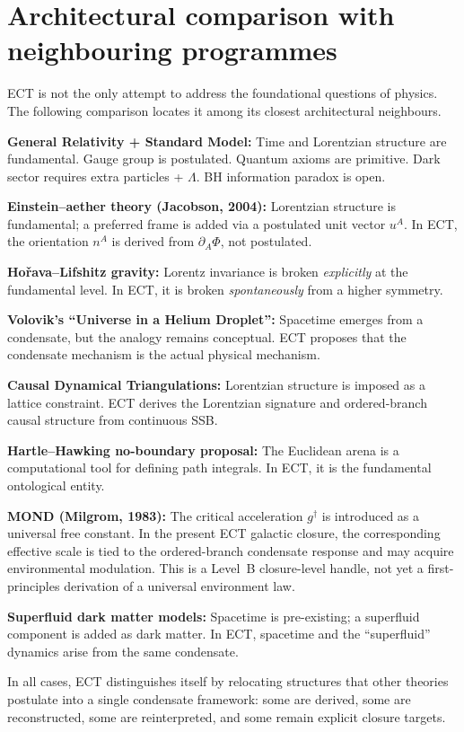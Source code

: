 \documentclass[11pt,a4paper]{article}
\begin{document}
\section{Architectural comparison with neighbouring programmes}

ECT is not the only attempt to address the foundational questions of physics. The following comparison locates it among its closest architectural neighbours.

\textbf{General Relativity + Standard Model:} Time and Lorentzian structure are fundamental. Gauge group is postulated. Quantum axioms are primitive. Dark sector requires extra particles + $\Lambda$. BH information paradox is open.

\textbf{Einstein--aether theory (Jacobson, 2004):} Lorentzian structure is fundamental; a preferred frame is added via a postulated unit vector $u^A$. In ECT, the orientation $n^A$ is derived from $\partial_A\Phi$, not postulated.

\textbf{Ho\v{r}ava--Lifshitz gravity:} Lorentz invariance is broken \emph{explicitly} at the fundamental level. In ECT, it is broken \emph{spontaneously} from a higher symmetry.

\textbf{Volovik's ``Universe in a Helium Droplet'':} Spacetime emerges from a condensate, but the analogy remains conceptual. ECT proposes that the condensate mechanism is the actual physical mechanism.

\textbf{Causal Dynamical Triangulations:} Lorentzian structure is imposed as a lattice constraint. ECT derives the Lorentzian signature and ordered-branch causal structure from continuous SSB.

\textbf{Hartle--Hawking no-boundary proposal:} The Euclidean arena is a computational tool for defining path integrals. In ECT, it is the fundamental ontological entity.

\textbf{MOND (Milgrom, 1983):} The critical acceleration $g^\dagger$ is introduced as a universal free constant. In the present ECT galactic closure, the corresponding effective scale is tied to the ordered-branch condensate response and may acquire environmental modulation. This is a Level~B closure-level handle, not yet a first-principles derivation of a universal environment law.

\textbf{Superfluid dark matter models:} Spacetime is pre-existing; a superfluid component is added as dark matter. In ECT, spacetime and the ``superfluid'' dynamics arise from the same condensate.

In all cases, ECT distinguishes itself by relocating structures that other theories postulate into a single condensate framework: some are derived, some are reconstructed, some are reinterpreted, and some remain explicit closure targets.
\end{document}
